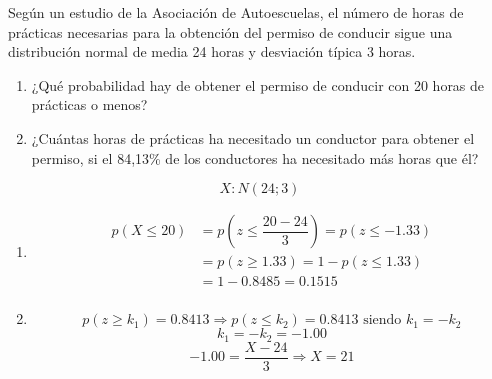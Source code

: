 \begin{exercise}
  Según un estudio de la Asociación de Autoescuelas, el número de horas de prácticas necesarias para la obtención del permiso de conducir sigue una distribución normal de media 24 horas y desviación típica 3 horas.
  \begin{enumerate}[label=\alph* )]
  \item ¿Qué probabilidad hay de obtener el permiso de conducir con 20 horas de prácticas o menos?
  \item ¿Cuántas horas de prácticas ha necesitado un conductor para obtener el permiso, si el 84,13\% de los conductores ha necesitado más horas que él?
  \end{enumerate}

  \tcblower

  \[ X:N(24;3) \]
  \begin{enumerate}[label=\alph* )]
  \item
  \begin{align*}
  p(X \leq 20) & = p \left( z \leq \dfrac{20-24}{3} \right)= p(z \leq -1.33) \\
  & = p(z \geq 1.33)= 1-p(z \leq 1.33) \\
  & = 1-0.8485 = 0.1515 \\
  \end{align*}

  \item
  \[p(z \geq k_1)=0.8413 \Rightarrow p(z \leq k_2)=0.8413 \text{ siendo } k_1=-k_2\]
  \[k_1=-k_2=-1.00\]
  \[-1.00=\dfrac{X-24}{3} \Rightarrow X=21\]
  \end{enumerate}
\end{exercise}

